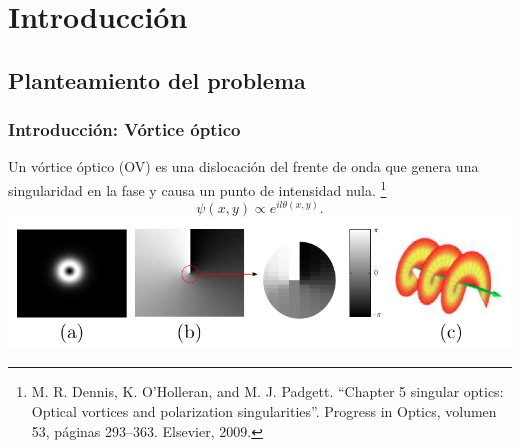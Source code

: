 \documentclass[serif,8pt]{beamer}
\begin{document}


\section{Introducción} 
\setcounter{subsection}{1}
		
		\subsection{Planteamiento del problema}	
		\begin{frame}
		\frametitle{Introducción: Vórtice óptico}
Un vórtice óptico (OV) es una dislocación del frente de onda que genera una singularidad en la fase y causa un punto de intensidad nula. 
		\footnote{M. R. Dennis, K. O’Holleran, and M. J. Padgett. ``Chapter 5 singular optics: Optical vortices and polarization singularities''. Progress in Optics, volumen 53, páginas 293–363. Elsevier, 2009.} %
		$$\psi(x,y) \propto e^{il\theta(x,y)}.$$
		\includegraphics[scale=0.33]{img/dibujo.png}
		\end{frame}
	
\end{document}
